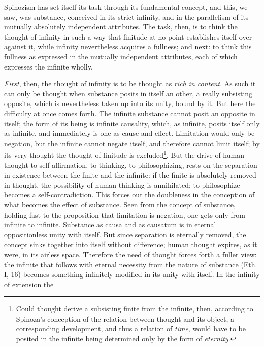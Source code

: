 \documentclass[12pt,a4paper,openany]{book}
\newcommand{\opage}[1]{\marginnote{\footnotesize\textit{[#1]}}}
\begin{document}
Spinozism has set itself its task through its fundamental concept,
and this, we saw, was substance, conceived in its
strict infinity, and in the parallelism of its mutually
absolutely independent attributes. The task, then, is to think
the thought of infinity in such a way that finitude at no
point establishes itself over against it, while infinity nevertheless
acquires a fullness; and next: to think this fullness
as expressed in the mutually independent attributes, each of which
expresses the infinite wholly.

\emph{First}, then, the thought of infinity is to be thought as
\emph{rich in content}. As such it can only be thought when
substance posits in itself an other, a really subsisting
opposite, which is nevertheless taken up into its unity, bound by
it. But here the difficulty at once comes forth. The
infinite substance cannot posit an opposite in
itself; the form of its being is infinite causality, which,
as infinite, posits itself only as infinite, and immediately
is one as cause and effect. Limitation would
only be negation, but the infinite cannot negate
itself, and therefore cannot limit itself; by its very thought
the thought of finitude is excluded\footnote{Could thought derive
a subsisting finite from the infinite, then, according to
Spinoza's conception of the relation between thought and
its object, a corresponding development, and thus a relation of
\emph{time}, would have to be posited in the infinite being determined only by the form of \emph{eternity}.}. But the drive of human
thought to self-affirmation, to thinking, to philosophizing,
rests on the separation in existence between the finite and the
infinite: if the finite is absolutely removed in thought, the
possibility of human thinking is annihilated; to philosophize
becomes a self-contradiction. This forces out the
\opage{176}\setcounter{footnote}{0}doubleness in the conception of what becomes the effect of substance.
Seen from the concept of substance, holding fast to the
proposition that limitation is negation, one gets only from
infinite to infinite. Substance as causa and as
causatum is in eternal oppositionless unity with itself.
But since separation is eternally removed, the concept sinks together
into itself without difference; human thought expires,
as it were, in its airless space. Therefore the need of thought
forces forth a fuller view: the infinite that
follows with eternal necessity from the nature of substance (Eth.
I, 16) becomes something infinitely modified in its unity with itself.
In the infinity of extension the
\end{document}
